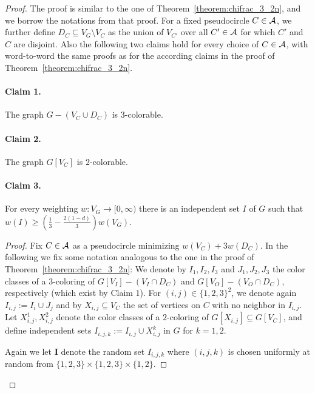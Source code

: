 \documentclass[fontsize=11pt,a4paper,DIV12]{scrartcl}
\def\AA{{\cal A}}
\begin{document}
\begin{proof}
  The proof is similar to the one of Theorem~\ref{theorem:chifrac_3_2n}, and
  we borrow the notations from that proof. For a fixed pseudocircle $C \in \AA$, we
  further define $D_C \subseteq V_G\setminus V_C$ as the union of $V_{C'}$
  over all $C' \in \AA$ for which $C'$ and $C$ are disjoint. Also the
  following two claims hold for every choice of $C \in \AA$, with
  word-to-word the same proofs as for the according claims in the proof of
  Theorem~\ref{theorem:chifrac_3_2n}.
	
\paragraph{Claim 1.}
The graph $G-(V_C \cup D_C)$ is $3$-colorable.


\paragraph{Claim 2.}
The graph $G[V_C]$ is $2$-colorable.

\paragraph{Claim 3.} For every weighting $w:V_G \rightarrow [0,\infty)$ there
is an independent set $I$ of $G$ such that
$w(I) \ge (\frac{1}{3}-\frac{2(1-d)}{3})w(V_G)$.
\begin{proof}
  Fix $C \in \AA$ as a pseudocircle minimizing $w(V_C)+3w(D_C)$. In the
  following we fix some notation analogous to the one in the proof of
  Theorem~\ref{theorem:chifrac_3_2n}: We denote by $I_1, I_2, I_3$ and
  $J_1, J_2, J_3$ the color classes of a $3$-coloring of
  $G[V_I]-(V_I \cap D_C)$ and $G[V_O]-(V_O \cap D_C)$, respectively (which
  exist by Claim 1).  For $(i,j) \in \{1,2,3\}^2$, we denote again
  $I_{i,j}:=I_i\cup J_j$ and by $X_{i,j} \subseteq V_C$ the set of vertices on
  $C$ with no neighbor in $I_{i,j}$. Let $X_{i,j}^1, X_{i,j}^2$ denote the
  color classes of a $2$-coloring of $G[X_{i,j}] \subseteq G[V_C]$, and define
  independent sets $I_{i,j,k}:=I_{i,j} \cup X_{i,j}^k$ in $G$ for $k=1,2$.
		
  Again we let $\textbf{I}$ denote the random set $I_{i,j,k}$ where $(i,j,k)$
  is chosen uniformly at random from $\{1,2,3\}\times\{1,2,3\}\times\{1,2\}$.
		

\end{proof}
\end{proof}
\end{document}
